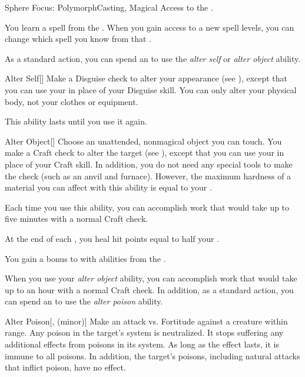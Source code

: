     \begin{feat}{Sphere Focus: Polymorph}{Casting, Magical}
        \featpre Access to the  .

         You learn a spell from the  .
        When you gain access to a new spell levels, you can change which spell you know from that .

         As a standard action, you can spend an  to use the \textit{alter self} or \textit{alter object} ability.
        \begin{ability}{Alter Self}[]
            Make a Disguise check to alter your appearance (see ), except that you can use your  in place of your Disguise skill.
            You can only alter your physical body, not your clothes or equipment.

            This ability lasts until you use it again.
        \end{ability}

        \begin{ability}{Alter Object}[]
            Choose an unattended, nonmagical object you can touch.
            You make a Craft check to alter the target (see ), except that you can use your  in place of your Craft skill.
            In addition, you do not need any special tools to make the check (such as an anvil and furnace).
            However, the maximum hardness of a material you can affect with this ability is equal to your .

            Each time you use this ability, you can accomplish work that would take up to five minutes with a normal Craft check.
        \end{ability}

         At the end of each , you heal hit points equal to half your .

         You gain a  bonus to  with abilities from the  .

         When you use your \textit{alter object} ability, you can accomplish work that would take up to an hour with a normal Craft check.
        In addition, as a standard action, you can spend an  to use the \textit{alter poison} ability.
        \begin{ability}{Alter Poison}[,  (minor)]
            Make an attack vs. Fortitude against a creature within \rngclose range.
            \hit Any poison in the target's system is neutralized.
            It stops suffering any additional effects from poisons in its system.
            As long as the effect lasts, it is immune to all poisons.
            In addition, the target's  poisons, including natural attacks that inflict poison, have no effect.
        \end{ability}


\end{feat}
